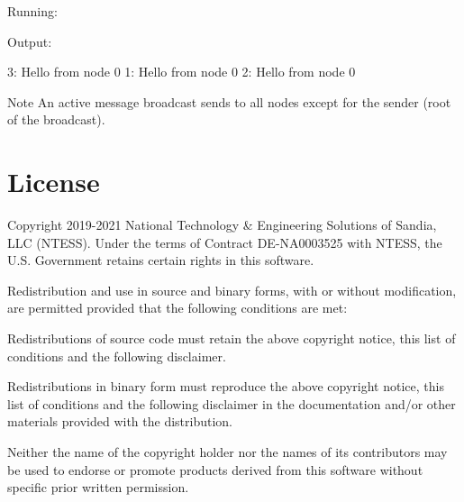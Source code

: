 Running\+:




Output\+: 
\begin{DoxyCode}
3: Hello from node 0
1: Hello from node 0
2: Hello from node 0
\end{DoxyCode}


\begin{DoxyNote}{Note}
An active message broadcast sends to all nodes except for the sender (root of the broadcast). 
\end{DoxyNote}
\hypertarget{introduction_License}{}\section{License}\label{introduction_License}


Copyright 2019-\/2021 National Technology \& Engineering Solutions of Sandia, L\+LC (N\+T\+E\+SS). Under the terms of Contract D\+E-\/\+N\+A0003525 with N\+T\+E\+SS, the U.\+S. Government retains certain rights in this software.

Redistribution and use in source and binary forms, with or without modification, are permitted provided that the following conditions are met\+:


\begin{DoxyItemize}
\item Redistributions of source code must retain the above copyright notice, this list of conditions and the following disclaimer.
\item Redistributions in binary form must reproduce the above copyright notice, this list of conditions and the following disclaimer in the documentation and/or other materials provided with the distribution.
\item Neither the name of the copyright holder nor the names of its contributors may be used to endorse or promote products derived from this software without specific prior written permission.
\end{DoxyItemize}

